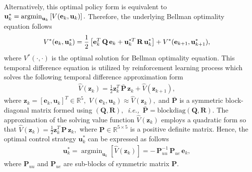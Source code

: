 \documentclass[conference]{IEEEtran}
\DeclareMathOperator*{\argmin}{arg min}
\begin{document}
%
Alternatively, this optimal  policy form is equivalent to ${\bf u}^*_k = \argmin_{{\bf u}_k}\left[
V({\bf e}_{k},{\bf u}_{k})\right].$
Therefore, the underlying Bellman optimality equation follows %
%
\begin{equation*}
\label{eq:BellOpt}
V^*({\bf e}_k,{\bf u}^*_k)= \frac{1}{2}\left[{\bf e}_k^T\, {\bf Q}\, {\bf e}_k + {\bf u}_k^{*T}\, {\bf R}\, {\bf u}^*_k\right] +V^*({\bf e}_{k+1},{\bf u}^*_{k+1}),
\end{equation*}
%
where $V^*(\cdot,\cdot)$ is the optimal solution for Bellman optimality equation. This temporal difference equation is utilized by reinforcement learning process which solves the following temporal difference approximation form %
%
\begin{align}
\hat{V}(\mathbf{z}_k) = \frac{1}{2}\mathbf{z}_k^T\, \bar{\mathbf{P}}\, \mathbf{z}_k + \hat{V}(\mathbf{z}_{k+1}),
\label{eq:valueFunctionEstimated}
\end{align}
%
where $\mathbf{z}_k = \left[\mathbf{e}_k ,\mathbf{u}_k\right]^T\in\mathbb{R}^5,$ $V\left(\mathbf{e}_k,\mathbf{u}_k\right) \approx \hat{V}(\mathbf{z}_k),$  and $\bar{\mathbf{P}}$ is a symmetric block-diagonal matrix formed using $(\mathbf{Q},\mathbf{R}),$~\textit{i.e.,~}$\bar{\mathbf{P}} = \mathrm{blockdiag}(\mathbf{Q},\mathbf{R}).$ %
The approximation of the solving value function $\hat{V}(\mathbf{z}_k)$ employs a quadratic form so that $\hat{V}(\mathbf{z}_k)=\frac{1}{2}\mathbf{z}_k^T\, \mathbf{P}\, \mathbf{z}_k,$ where $\mathbf{P}\in\mathbb{R}^{5\times 5}$ is a positive definite matrix. Hence, the optimal control strategy $\mathbf{u}_k^*$ can be expressed as follows %
%
\begin{align}
\label{eq:modelFreePolicy}    
\mathbf{u}_k^* = \argmin_{\mathbf{u}_k}\left[\hat{V}(\mathbf{z}_k)\right] = -\,  \mathbf{P}_{uu}^{-1}\, \mathbf{P}_{ue}\, \mathbf{e}_k,
\end{align}
%
where $\mathbf{P}_{uu}$ and $\mathbf{P}_{ue}$ are sub-blocks of symmetric matrix $\mathbf{P}.$ %
%
\end{document}

